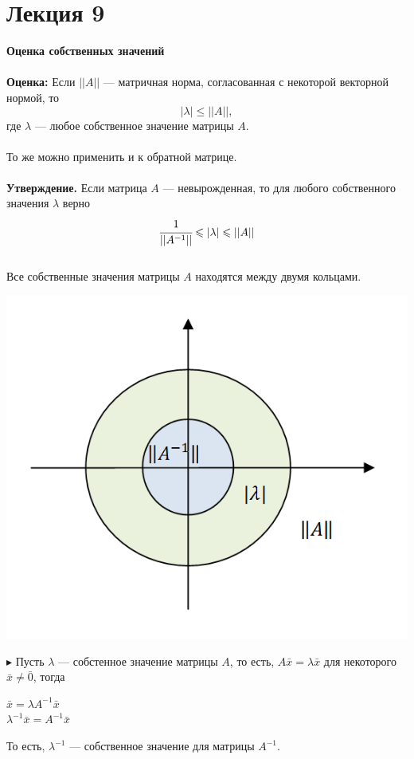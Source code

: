 \documentclass[12pt]{article}
\theoremstyle{definition}
\numberwithin{equation}{section}
\begin{document}
\section *{Лекция 9}
\noindent\textbf{Оценка собственных значений}\\ \\
\textbf{Оценка:} Если $||A||$ --- матричная норма, согласованная с некоторой векторной нормой, то $$|\lambda|\leqslant||A||,$$ где $\lambda$ --- любое собственное значение матрицы $A$.\\
\\
То же можно применить и к обратной матрице.\\
\\
\textbf{Утверждение.} Если матрица $A$ --- невырожденная, то для любого собственного значения $\lambda$ верно $$\cfrac{1}{||A^{-1}||}\leqslant|\lambda|\leqslant||A||$$
~\\Все собственные значения матрицы $A$ находятся между двумя кольцами.
\begin{center}
\includegraphics[scale=0.8]{l9_1.png}
\end{center}
$\blacktriangleright$ Пусть $\lambda$ --- собстенное значение матрицы $A$, то есть, $A\bar x=\lambda\bar x$ для некоторого $\bar x\neq \bar 0$, тогда
\begin{center}
$\bar x=\lambda A^{-1} \bar x$\\
$\lambda^{-1}\bar x=A^{-1}\bar x$
\end{center}
То есть, $\lambda^{-1}$ --- собственное значение для матрицы $A^{-1}$.\\
\end{document}
